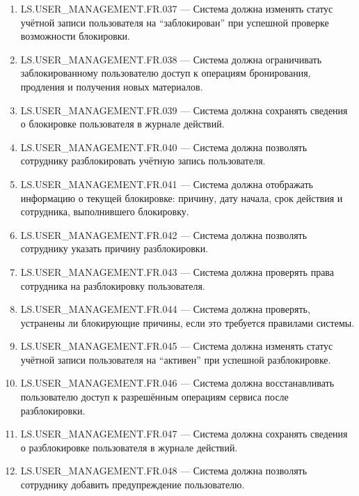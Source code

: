 \documentclass[12pt,a4paper]{article}
\begin{document}
\begin{enumerate}
		\item LS.USER\_MANAGEMENT.FR.037 --- Система должна изменять статус учётной
		записи пользователя на ``заблокирован'' при успешной проверке возможности
		блокировки.
		
		\item LS.USER\_MANAGEMENT.FR.038 --- Система должна ограничивать
		заблокированному пользователю доступ к операциям бронирования, продления и
		получения новых материалов.
		
		\item LS.USER\_MANAGEMENT.FR.039 --- Система должна сохранять сведения о
		блокировке пользователя в журнале действий.
		
		\item LS.USER\_MANAGEMENT.FR.040 --- Система должна позволять сотруднику
		разблокировать учётную запись пользователя.
		
		\item LS.USER\_MANAGEMENT.FR.041 --- Система должна отображать информацию о
		текущей блокировке: причину, дату начала, срок действия и сотрудника,
		выполнившего блокировку.
		
		\item LS.USER\_MANAGEMENT.FR.042 --- Система должна позволять сотруднику
		указать причину разблокировки.
		
		\item LS.USER\_MANAGEMENT.FR.043 --- Система должна проверять права
		сотрудника на разблокировку пользователя.
		
		\item LS.USER\_MANAGEMENT.FR.044 --- Система должна проверять, устранены ли
		блокирующие причины, если это требуется правилами системы.
		
		\item LS.USER\_MANAGEMENT.FR.045 --- Система должна изменять статус учётной
		записи пользователя на ``активен'' при успешной разблокировке.
		
		\item LS.USER\_MANAGEMENT.FR.046 --- Система должна восстанавливать
		пользователю доступ к разрешённым операциям сервиса после разблокировки.
		
		\item LS.USER\_MANAGEMENT.FR.047 --- Система должна сохранять сведения о
		разблокировке пользователя в журнале действий.
		
		\item LS.USER\_MANAGEMENT.FR.048 --- Система должна позволять сотруднику
		добавить предупреждение пользователю.
		

\end{enumerate}
\end{document}
